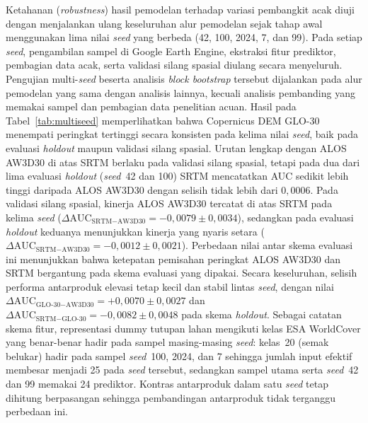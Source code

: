 \documentclass[12pt]{article}
\begin{document}
Ketahanan (\textit{robustness}) hasil pemodelan terhadap variasi pembangkit
acak diuji dengan menjalankan ulang keseluruhan alur pemodelan sejak tahap
awal menggunakan lima nilai \textit{seed} yang berbeda (42, 100, 2024, 7, dan
99). Pada setiap \textit{seed}, pengambilan sampel di Google Earth Engine,
ekstraksi fitur prediktor, pembagian data acak, serta validasi silang spasial
diulang secara menyeluruh. Pengujian multi-\textit{seed} beserta analisis
\textit{block bootstrap} tersebut dijalankan pada alur pemodelan yang sama
dengan analisis lainnya, kecuali analisis pembanding yang memakai sampel dan
pembagian data penelitian acuan. Hasil pada Tabel~\ref{tab:multiseed} memperlihatkan bahwa
Copernicus DEM GLO-30 menempati peringkat tertinggi secara konsisten pada
kelima nilai \textit{seed}, baik pada evaluasi \textit{holdout} maupun validasi
silang spasial. Urutan lengkap dengan ALOS AW3D30 di atas SRTM berlaku pada
validasi silang spasial, tetapi pada dua dari lima evaluasi \textit{holdout}
(\textit{seed}~42 dan 100) SRTM mencatatkan AUC sedikit lebih tinggi daripada
ALOS AW3D30 dengan selisih tidak lebih dari $0{,}0006$. Pada validasi silang spasial, kinerja ALOS
AW3D30 tercatat di atas SRTM pada kelima \textit{seed}
($\Delta\text{AUC}_{\text{SRTM}-\text{AW3D30}} = -0{,}0079 \pm 0{,}0034$),
sedangkan pada evaluasi \textit{holdout} keduanya menunjukkan kinerja yang
nyaris setara ($\Delta\text{AUC}_{\text{SRTM}-\text{AW3D30}} = -0{,}0012 \pm
0{,}0021$). Perbedaan nilai antar skema evaluasi ini menunjukkan bahwa ketepatan
pemisahan peringkat ALOS AW3D30 dan SRTM bergantung pada skema evaluasi yang
dipakai. Secara keseluruhan, selisih performa antarproduk elevasi tetap
kecil dan stabil lintas \textit{seed}, dengan nilai
$\Delta\text{AUC}_{\text{GLO-30}-\text{AW3D30}} = +0{,}0070 \pm 0{,}0027$ dan
$\Delta\text{AUC}_{\text{SRTM}-\text{GLO-30}} = -0{,}0082 \pm 0{,}0048$ pada
skema \textit{holdout}. Sebagai catatan skema fitur, representasi dummy tutupan
lahan mengikuti kelas ESA WorldCover yang benar-benar hadir pada sampel
masing-masing \textit{seed}: kelas~20 (semak belukar) hadir pada sampel
\textit{seed}~100, 2024, dan 7 sehingga jumlah input efektif membesar menjadi
25 pada \textit{seed} tersebut, sedangkan sampel utama serta \textit{seed}~42
dan 99 memakai 24 prediktor. Kontras antarproduk dalam satu \textit{seed}
tetap dihitung berpasangan sehingga pembandingan antarproduk tidak terganggu
perbedaan ini.
\end{document}
